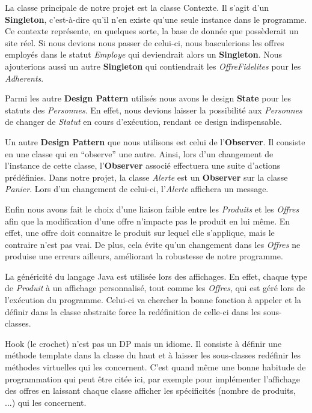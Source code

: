 \documentclass{article}
\begin{document}
La classe principale de notre projet est la classe Contexte.
Il s'agit d'un \textbf{Singleton}, c'est-à-dire qu'il n'en existe qu'une seule instance dans le programme.
Ce contexte représente, en quelques sorte, la base de donnée que possèderait un site réel.
Si nous devions nous passer de celui-ci, nous basculerions les offres employés dans le statut \emph{Employe} qui deviendrait alors un \textbf{Singleton}.
Nous ajouterions aussi un autre \textbf{Singleton} qui contiendrait les \emph{OffreFidelites} pour les \emph{Adherents}.
\par
Parmi les autre \textbf{Design Pattern} utilisés nous avons le design \textbf{State} pour les statuts des \emph{Personnes}.
En effet, nous devions laisser la possibilité aux \emph{Personnes} de changer de \emph{Statut} en cours d'exécution, rendant ce design indispensable.
\par
Un autre \textbf{Design Pattern} que nous utilisons est celui de l'\textbf{Observer}.
Il consiste en une classe qui en ``observe'' une autre.
Ainsi, lors d'un changement de l'instance de cette classe, l'\textbf{Observer} associé effectuera une suite d'actions prédéfinies.
Dans notre projet, la classe \emph{Alerte} est un \textbf{Observer} sur la classe \emph{Panier}.
Lors d'un changement de celui-ci, l'\emph{Alerte} affichera un message.
\par
Enfin nous avons fait le choix d'une liaison faible entre les \emph{Produits} et les \emph{Offres} afin que la modification d'une offre n'impacte pas le produit en lui même.
En effet, une offre doit connaitre le produit sur lequel elle s'applique, mais le contraire n'est pas vrai.
De plus, cela évite qu'un changement dans les \emph{Offres} ne produise une erreurs ailleurs, améliorant la robustesse de notre programme.
\par
La généricité du langage Java est utilisée lors des affichages.
En effet, chaque type de \emph{Produit} à un affichage personnalisé, tout comme les \emph{Offres}, qui est géré lors de l'exécution du programme.
Celui-ci va chercher la bonne fonction à appeler et la définir dans la classe abstraite force la redéfinition de celle-ci dans les sous-classes.

{
Hook (le crochet) n'est pas un DP mais un idiome. Il consiste à définir une méthode template dans
la classe du haut et à laisser les sous-classes redéfinir les méthodes virtuelles qui les
concernent. C'est quand même une bonne habitude de programmation qui peut être citée ici,
par exemple pour implémenter l'affichage des offres en laissant chaque classe afficher les
spécificités (nombre de produits, ...) qui les concernent.
}
\end{document}

